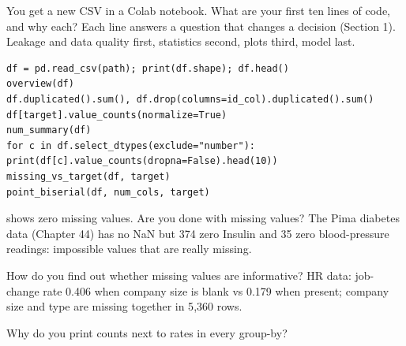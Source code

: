 \begin{qa}{ You get a new CSV in a Colab notebook. What are your first ten lines of code, and why each?}
\why Each line answers a question that changes a decision (Section 1). Leakage and data quality first, statistics second, plots third, model last.
\worked
\begin{lstlisting}
df = pd.read_csv(path); print(df.shape); df.head()
overview(df)
df.duplicated().sum(), df.drop(columns=id_col).duplicated().sum()
df[target].value_counts(normalize=True)
num_summary(df)
for c in df.select_dtypes(exclude="number"): print(df[c].value_counts(dropna=False).head(10))
missing_vs_target(df, target)
point_biserial(df, num_cols, target)
\end{lstlisting}
\end{qa}

\begin{qa}{\deep {} shows zero missing values. Are you done with missing values?}
\worked The Pima diabetes data (Chapter 44) has no NaN but 374 zero Insulin and 35 zero blood-pressure readings: impossible values that are really missing.
\end{qa}

\begin{qa}{How do you find out whether missing values are informative?}
\worked HR data: job-change rate 0.406 when company size is blank vs 0.179 when present; company size and type are missing together in 5{,}360 rows.
\end{qa}

\begin{qa}{Why do you print counts next to rates in every group-by?}
\end{qa}

